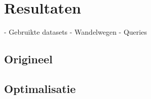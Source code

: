 \chapter{Resultaten}
\label{resultaten}

- Gebruikte datasets
- Wandelwegen
- Queries

\section{Origineel}
\label{resultaat-origineel}

\section{Optimalisatie}
\label{resultaat-optimalisatie}